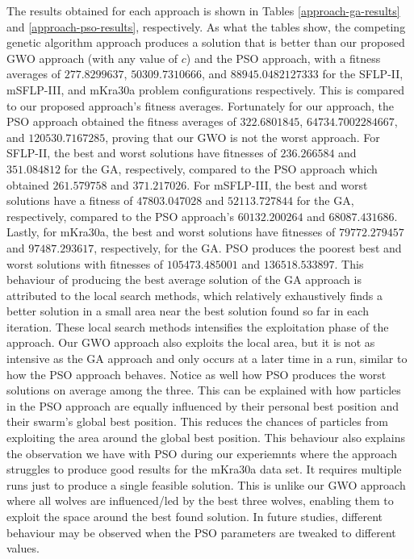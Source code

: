 The results obtained for each approach is shown in Tables \ref{approach-ga-results} and \ref{approach-pso-results}, respectively. As what the tables show, the competing genetic algorithm approach produces a solution that is better than our proposed GWO approach (with any value of $c$) and the PSO approach, with a fitness averages of $277.8299637$, $50309.7310666$, and $88945.0482127333$ for the SFLP-II, mSFLP-III, and mKra30a problem configurations respectively. This is compared to our proposed approach's fitness averages. Fortunately for our approach, the PSO approach obtained the fitness averages of $322.6801845$, $64734.7002284667$, and $120530.7167285$, proving that our GWO is not the worst approach. For SFLP-II, the best and worst solutions have fitnesses of $236.266584$ and $351.084812$ for the GA, respectively, compared to the PSO approach which obtained $261.579758$ and $371.217026$. For mSFLP-III, the best and worst solutions have a fitness of $47803.047028$ and $52113.727844$ for the GA, respectively, compared to the PSO approach's $60132.200264$ and $68087.431686$. Lastly, for mKra30a, the best and worst solutions have fitnesses of $79772.279457$ and $97487.293617$, respectively, for the GA. PSO produces the poorest best and worst solutions with fitnesses of $105473.485001$ and $136518.533897$. This behaviour of producing the best average solution of the GA approach is attributed to the local search methods, which relatively exhaustively finds a better solution in a small area near the best solution found so far in each iteration. These local search methods intensifies the exploitation phase of the approach. Our GWO approach also exploits the local area, but it is not as intensive as the GA approach and only occurs at a later time in a run, similar to how the PSO approach behaves. Notice as well how PSO produces the worst solutions on average among the three. This can be explained with how particles in the PSO approach are equally influenced by their personal best position and their swarm's global best position. This reduces the chances of particles from exploiting the area around the global best position. This behaviour also explains the observation we have with PSO during our experiemnts where the approach struggles to produce good results for the mKra30a data set. It requires multiple runs just to produce a single feasible solution. This is unlike our GWO approach where all wolves are influenced/led by the best three wolves, enabling them to exploit the space around the best found solution. In future studies, different behaviour may be observed when the PSO parameters are tweaked to different values.

